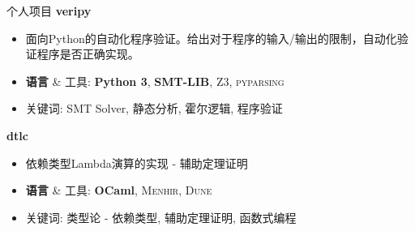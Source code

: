 \documentclass{resume}
\begin{document}
\begin{CJK*}{UTF8}{gbsn}
\begin{rSection}{个人项目}
		\textbf{veripy} %
		\vspace{-5pt}

		\begin{itemize}
			\setlength{\itemsep}{1pt}
            \setlength{\parskip}{0pt}
			\setlength{\parsep}{0pt}
			\item 面向Python的自动化程序验证。给出对于程序的输入/输出的限制，自动化验证程序是否正确实现。
			\item \textbf{语言} \& \textsc{工具}: \textbf{Python 3}, \textbf{SMT-LIB}, \textsc{Z3}, \textsc{pyparsing}
			\item 关键词: SMT Solver, 静态分析, 霍尔逻辑, 程序验证
		\end{itemize}

		\textbf{dtlc} %
		\vspace{-5pt}

		\begin{itemize}
			\setlength{\itemsep}{1pt}
            \setlength{\parskip}{0pt}
			\setlength{\parsep}{0pt}
			\item 依赖类型Lambda演算的实现 - 辅助定理证明
			\item \textbf{语言} \& \textsc{工具}: \textbf{OCaml}, \textsc{Menhir}, \textsc{Dune}
			\item 关键词: 类型论 - 依赖类型, 辅助定理证明, 函数式编程
		\end{itemize}





\end{rSection}
\end{CJK*}
\end{document}
